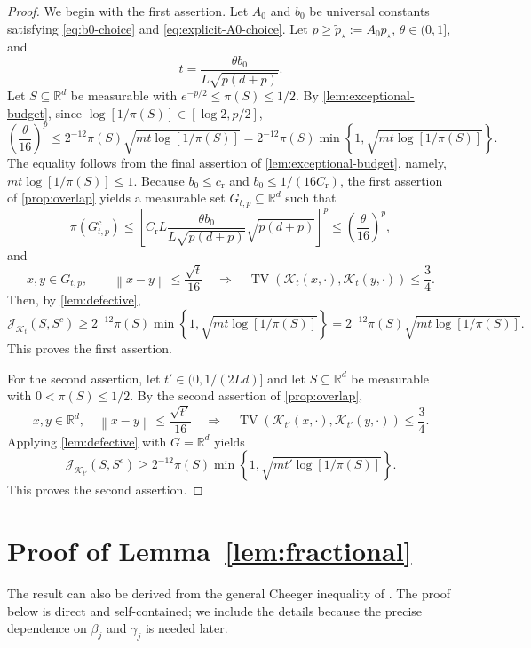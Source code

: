 \documentclass[11pt]{article}
\newcommand{\R}{\mathbb R}
\newcommand{\TV}{\operatorname{TV}}
\newcommand{\cK}{\mathcal K}
\newcommand{\norm}[1]{\left\lVert #1\right\rVert}
\newcommand{\1}{\mathbf 1}
\begin{document}
	\begin{proof}
		We begin with the first assertion.
		Let $A_0$ and $b_0$ be universal constants satisfying
		\eqref{eq:b0-choice} and \eqref{eq:explicit-A0-choice}.
		Let \(p\geq  \widetilde p_\star:=A_0p_\star \),
		\(\theta\in(0,1]\), and
		\[
		t=\frac{\theta b_0}{L\sqrt{p(d+p)}}.
		\]
		Let $S\subseteq\R^d$ be measurable with
		$e^{-p/2}\leq\pi(S)\leq1/2$.
		By \cref{lem:exceptional-budget}, since
		$\log[1/\pi(S)]\in[\log 2,p/2]$,
		\[
		\left(\frac{\theta}{16}\right)^p
		\leq 2^{-12} \pi(S)\sqrt{mt\log[1/\pi(S)]}
		= 2^{-12} \pi(S)\min\left\{1,\sqrt{mt\log[1/\pi(S)]}\right\}.
		\]
		The equality follows from the final assertion of
		\cref{lem:exceptional-budget}, namely,
		$mt\log[1/\pi(S)]\leq1$.
		Because $b_0\leq c_{\mathrm r}$ and
		$b_0\leq1/(16C_{\mathrm r})$, the first assertion of
		\cref{prop:overlap} yields a measurable set $G_{t,p}\subseteq\R^d$ such
		that
		\[
		\pi(G_{t,p}^c) \leq \left[ C_{\mathrm{r}} L \frac{\theta b_0}{L\sqrt{p(d+p)}} \sqrt{p(d+p)} \right]^p \leq \left( \frac{\theta}{16}\right)^p,
		\]
		and
		\[
		x,y\in G_{t,p},\qquad
		\norm{x-y}\leq\frac{\sqrt{t}}{16}
		\quad\Longrightarrow\quad
		\TV(\cK_t(x,\cdot),\cK_t(y,\cdot))\leq\frac34.
		\]
		Then, by \cref{lem:defective},
		\[
		\mathcal{J}_{\cK_t}(S,S^c)
		\geq 2^{-12} \pi(S)\min\left\{1,\sqrt{mt\log[1/\pi(S)]}\right\}
		= 2^{-12} \pi(S)\sqrt{mt\log[1/\pi(S)]}.
		\]
		This proves the first assertion.
		
		For the second assertion, let $t'\in(0,1/(2Ld)]$ and let
		$S\subseteq\R^d$ be measurable with $0<\pi(S)\leq1/2$.  By the second
		assertion of \cref{prop:overlap},
		\[
		x,y\in\R^d,\quad
		\norm{x-y}\leq\frac{\sqrt{t'}}{16}
		\quad\Longrightarrow\quad
		\TV(\cK_{t'}(x,\cdot),\cK_{t'}(y,\cdot))\leq\frac34.
		\]
		Applying \cref{lem:defective} with $G=\R^d$ yields
		\[
		\mathcal{J}_{\cK_{t'}}(S,S^c)
		\geq 2^{-12} \pi(S)
		\min\left\{1,\sqrt{mt'\log[1/\pi(S)]}\right\}.
		\]
		This proves the second assertion.
	\end{proof}
	
	
	\section{Proof of Lemma~\ref{lem:fractional}}\label{app:fractional}
	
	The result can also be derived from the general Cheeger inequality of
	\citet{ChenWang2000}.  The proof below is direct and self-contained; we
	include the details because the precise dependence on \(\beta_j\) and
	\(\gamma_j\) is needed later.
	
\end{document}
